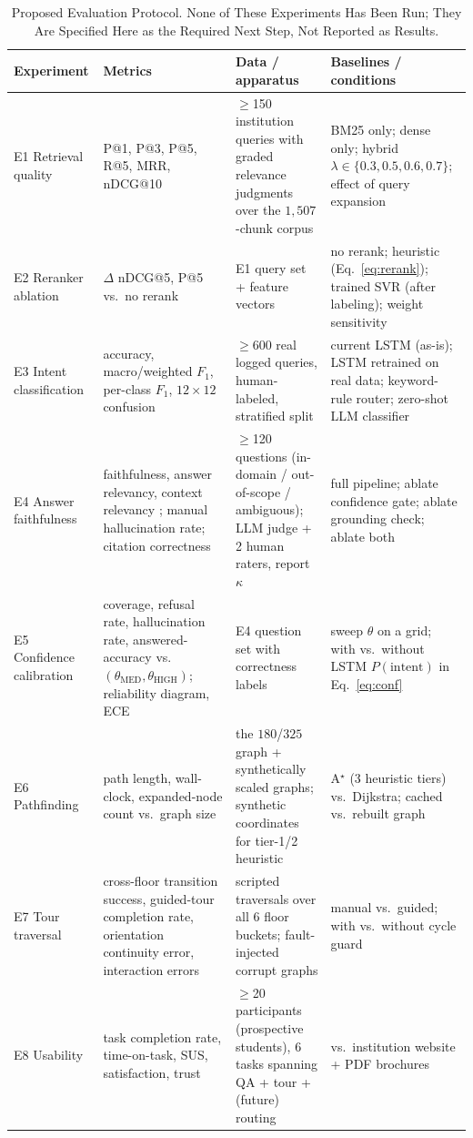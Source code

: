 \begin{table}[!t]
\centering
\caption{Proposed Evaluation Protocol. None of These Experiments Has Been
Run; They Are Specified Here as the Required Next Step, Not Reported as
Results.}
\label{tab:evalprotocol}
\footnotesize
\renewcommand{\arraystretch}{1.25}
\begin{tabular}{@{}p{2.5cm}p{3.4cm}p{4.0cm}p{4.7cm}@{}}
\toprule
\textbf{Experiment} & \textbf{Metrics} & \textbf{Data / apparatus} & \textbf{Baselines / conditions} \\
\midrule
E1 Retrieval quality &
P@1, P@3, P@5, R@5, MRR, nDCG@10 \cite{jarvelin2002ndcg} &
$\ge$150 institution queries with graded relevance judgments over the
$1{,}507$-chunk corpus &
BM25 only; dense only; hybrid $\lambda\!\in\!\{0.3,0.5,0.6,0.7\}$; effect of
query expansion \\

E2 Reranker ablation &
$\Delta$ nDCG@5, P@5 vs.\ no rerank &
E1 query set + feature vectors &
no rerank; heuristic (Eq.~\eqref{eq:rerank}); trained SVR (after labeling);
weight sensitivity \\

E3 Intent classification &
accuracy, macro/weighted $F_1$, per-class $F_1$, $12{\times}12$ confusion &
$\ge$600 real logged queries, human-labeled, stratified split &
current LSTM (as-is); LSTM retrained on real data; keyword-rule router;
zero-shot LLM classifier \\

E4 Answer faithfulness &
faithfulness, answer relevancy, context relevancy \cite{es2024ragas};
manual hallucination rate; citation correctness &
$\ge$120 questions (in-domain / out-of-scope / ambiguous); LLM judge +
2 human raters, report $\kappa$ &
full pipeline; ablate confidence gate; ablate grounding check; ablate both \\

E5 Confidence calibration &
coverage, refusal rate, hallucination rate, answered-accuracy vs.\
$(\theta_{\text{MED}}, \theta_{\text{HIGH}})$; reliability diagram, ECE &
E4 question set with correctness labels &
sweep $\theta$ on a grid; with vs.\ without LSTM $P(\text{intent})$ in
Eq.~\eqref{eq:conf} \\

E6 Pathfinding &
path length, wall-clock, expanded-node count vs.\ graph size &
the $180$/$325$ graph + synthetically scaled graphs; synthetic coordinates
for tier-1/2 heuristic &
A$^{\star}$ (3 heuristic tiers) vs.\ Dijkstra; cached vs.\ rebuilt graph \\

E7 Tour traversal &
cross-floor transition success, guided-tour completion rate, orientation
continuity error, interaction errors &
scripted traversals over all $6$ floor buckets; fault-injected corrupt
graphs &
manual vs.\ guided; with vs.\ without cycle guard \\

E8 Usability &
task completion rate, time-on-task, SUS, satisfaction, trust &
$\ge$20 participants (prospective students), $6$ tasks spanning QA + tour +
(future) routing &
\system{} vs.\ institution website + PDF brochures \\
\bottomrule
\end{tabular}
\end{table}
